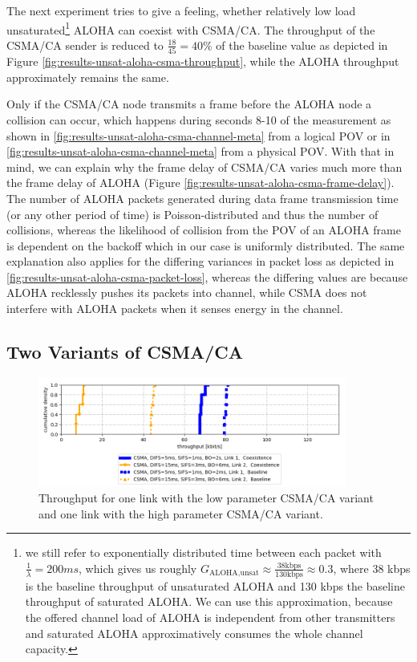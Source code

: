The next experiment tries to give a feeling, whether relatively low load unsaturated\footnote{we still refer to exponentially distributed time between each packet with $\frac{1}{\lambda}=200ms$, which gives us roughly $G_\text{ALOHA,unsat} \approx \frac{38 \text{kbps}}{130 \text{kbps}}\approx 0.3$, where 38 kbps is the baseline throughput of unsaturated ALOHA and 130 kbps the baseline throughput of saturated ALOHA. We can use this approximation, because the offered channel load of ALOHA is independent from other transmitters and saturated ALOHA approximatively consumes the whole channel capacity.} ALOHA can coexist with CSMA/CA. The throughput of the CSMA/CA sender is reduced to $\frac{18}{45}=40\%$ of the baseline value as depicted in Figure \ref{fig:results-unsat-aloha-csma-throughput}, while the ALOHA throughput approximately remains the same.

Only if the CSMA/CA node transmits a frame before the ALOHA node a collision can occur, which happens during seconds 8-10 of the measurement as shown in \ref{fig:results-unsat-aloha-csma-channel-meta} from a logical POV or in  \ref{fig:results-unsat-aloha-csma-channel-meta} from a physical POV. With that in mind, we can explain why the frame delay of CSMA/CA varies much more than the frame delay of ALOHA (Figure  \ref{fig:results-unsat-aloha-csma-frame-delay}). The number of ALOHA packets generated during data frame transmission time (or any other period of time) is Poisson-distributed and thus the number of collisions, whereas the likelihood of collision from the POV of an ALOHA frame is dependent on the backoff which in our case is uniformly distributed. The same explanation also applies for the differing variances in packet loss as depicted in \ref{fig:results-unsat-aloha-csma-packet-loss}, whereas the differing values are because ALOHA recklessly pushes its packets into channel, while CSMA does not interfere with ALOHA packets when it senses energy in the channel.


\subsection{Two Variants of CSMA/CA}

\begin{figure}[tb]
	\label{fig:results-csma-15-5-throughput}
	\begin{center}
		\includegraphics[width=0.9\textwidth]{pictures/results/different_combinations/csma_inhomogeneous/15_5/throughput_cdf}
	\end{center}
	\caption{Throughput for one link with the low parameter CSMA/CA variant and one link with the high parameter CSMA/CA variant.}
\end{figure}

